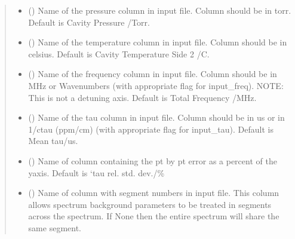 \documentclass[letterpaper,10pt,english]{sphinxmanual}
\begin{document}
\begin{fulllineitems}
\begin{quote}
\begin{description}
\begin{itemize}
\item {} 
\sphinxAtStartPar
{} (\sphinxstyleliteralemphasis{\sphinxupquote{, }}) \textendash{} Name of the pressure column in input file. Column should be in torr. Default is Cavity Pressure /Torr.

\item {} 
\sphinxAtStartPar
{} (\sphinxstyleliteralemphasis{\sphinxupquote{, }}) \textendash{} Name of the temperature column in input file. Column should be in celsius. Default is Cavity Temperature Side 2 /C.

\item {} 
\sphinxAtStartPar
{} (\sphinxstyleliteralemphasis{\sphinxupquote{, }}) \textendash{} Name of the frequency column in input file. Column should be in MHz or Wavenumbers (with appropriate flag for input\_freq). NOTE: This is not a detuning axis. Default is Total Frequency /MHz.

\item {} 
\sphinxAtStartPar
{} (\sphinxstyleliteralemphasis{\sphinxupquote{, }}) \textendash{} Name of the tau column in input file. Column should be in us or in 1/ctau (ppm/cm) (with appropriate flag for input\_tau). Default is Mean tau/us.

\item {} 
\sphinxAtStartPar
{} (\sphinxstyleliteralemphasis{\sphinxupquote{, }}) \textendash{} Name of column containing the pt by pt error as a percent of the y\sphinxhyphen{}axis. Default is ‘tau rel. std. dev./\%

\item {} 
\sphinxAtStartPar
{} (\sphinxstyleliteralemphasis{\sphinxupquote{, }}) \textendash{} Name of column with segment numbers in input file. This column allows spectrum background parameters to be treated in segments across the spectrum. If None then the entire spectrum will share the same segment.


\end{itemize}
\end{description}
\end{quote}
\end{fulllineitems}
\end{document}
